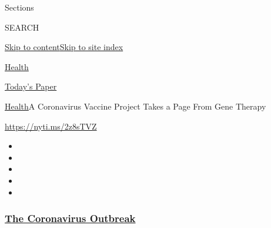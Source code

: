 Sections

SEARCH

\protect\hyperlink{site-content}{Skip to
content}\protect\hyperlink{site-index}{Skip to site index}

\href{https://www.nytimes3xbfgragh.onion/section/health}{Health}

\href{https://myaccount.nytimes3xbfgragh.onion/auth/login?response_type=cookie\&client_id=vi}{}

\href{https://www.nytimes3xbfgragh.onion/section/todayspaper}{Today's
Paper}

\href{/section/health}{Health}\textbar{}A Coronavirus Vaccine Project
Takes a Page From Gene Therapy

\url{https://nyti.ms/2z8sTVZ}

\begin{itemize}
\item
\item
\item
\item
\item
\end{itemize}

\hypertarget{the-coronavirus-outbreak}{%
\subsubsection{\texorpdfstring{\href{https://www.nytimes3xbfgragh.onion/news-event/coronavirus?name=styln-coronavirus-national\&region=TOP_BANNER\&block=storyline_menu_recirc\&action=click\&pgtype=Article\&impression_id=075be580-efba-11ea-9ddb-53a6a90d6799\&variant=undefined}{The
Coronavirus
Outbreak}}{The Coronavirus Outbreak}}\label{the-coronavirus-outbreak}}

